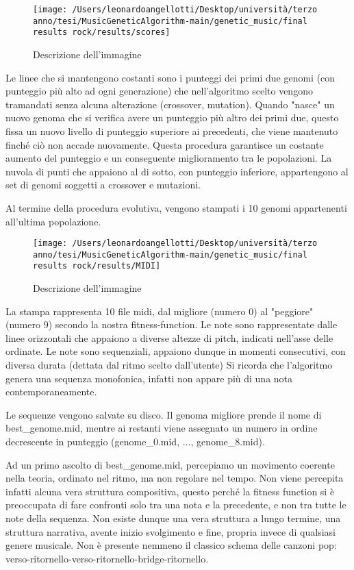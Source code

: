 \documentclass[a4paper,12pt]{report}
\begin{document}
\begin{figure}[h!]
    \centering
    \texttt{[image: /Users/leonardoangellotti/Desktop/università/terzo anno/tesi/MusicGeneticAlgorithm-main/genetic\_music/final results rock/results/scores]} 
    \caption{Descrizione dell'immagine}
    \label{fig:immagine}
\end{figure}

Le linee che si mantengono costanti sono i punteggi dei primi due genomi (con punteggio più alto ad ogni generazione) che nell'algoritmo scelto vengono tramandati senza alcuna alterazione (crossover, mutation).
Quando "nasce" un nuovo genoma che si verifica avere un punteggio più altro dei primi due, questo fissa un nuovo livello di punteggio superiore ai precedenti, che viene mantenuto finché ciò non accade nuovamente.
Questa procedura garantisce un costante aumento del punteggio e un conseguente miglioramento tra le popolazioni.
La nuvola di punti che appaiono al di sotto, con punteggio inferiore, appartengono al set di genomi soggetti a crossover e mutazioni.

Al termine della procedura evolutiva, vengono stampati i 10 genomi appartenenti all'ultima popolazione.

\begin{figure}[h!]
    \centering
    \texttt{[image: /Users/leonardoangellotti/Desktop/università/terzo anno/tesi/MusicGeneticAlgorithm-main/genetic\_music/final results rock/results/MIDI]} 
    \caption{Descrizione dell'immagine}
    \label{fig:immagine}
\end{figure}

La stampa rappresenta 10 file midi, dal migliore (numero 0) al "peggiore" (numero 9) secondo la nostra fitness-function.
Le note sono rappresentate dalle linee orizzontali che appaiono a diverse altezze di pitch, indicati nell'asse delle ordinate.
Le note sono sequenziali, appaiono dunque in momenti consecutivi, con diversa durata (dettata dal ritmo scelto dall'utente)
Si ricorda che l'algoritmo genera una sequenza monofonica, infatti non appare più di una nota contemporaneamente.

Le sequenze vengono salvate su disco. 
Il genoma migliore prende il nome di best_genome.mid, mentre ai restanti viene assegnato un numero in ordine decrescente in punteggio (genome_0.mid, ..., genome_8.mid).

Ad un primo ascolto di best_genome.mid, percepiamo un movimento coerente nella teoria, ordinato nel ritmo, ma non regolare nel tempo. 
Non viene percepita infatti alcuna vera struttura compositiva, questo perché la fitness function si è preoccupata di fare confronti solo tra una nota e la precedente, e non tra tutte le note della sequenza.
Non esiste dunque una vera struttura a lungo termine, una struttura narrativa, avente inizio svolgimento e fine, propria invece di qualsiasi genere musicale.
Non è presente nemmeno il classico schema delle canzoni pop: verso-ritornello-verso-ritornello-bridge-ritornello.
\end{document}
